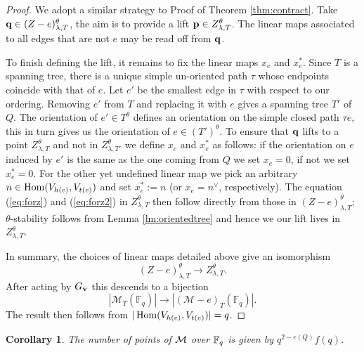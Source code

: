 \documentclass{amsart}
\newtheorem{cor}[thm]{Corollary}
\theoremstyle{definition}
\begin{document}
\begin{proof}
We adopt a similar strategy to Proof of Theorem \ref{thm:contract}.
Take $\mathbf{q} \in (Z-e)_{\lambda,T}^\theta$, the aim is to provide a lift $\mathbf{p} \in Z_{\lambda,T}^\theta$.
The linear maps associated to all edges that are not $e$ may be read off from $\mathbf{q}$.

To finish defining the lift, it remains to fix the linear maps $x_e$ and $x_e^*$.
Since $T$ is a spanning tree, there is a unique simple un-oriented path $\tau$ whose endpoints coincide with that of $e$.
Let $e'$ be the smallest edge in $\tau$ with respect to our ordering.
Removing $e'$ from $T$ and replacing it with $e$ gives a spanning tree $T'$ of $Q$.
The orientation of $e' \in T^\theta$ defines an orientation on the simple closed path $\tau e$, this in turn gives us the orientation of $e \in (T')^\theta$.
To ensure that $\mathbf{q}$ lifts to a point $Z_{\lambda,T}^\theta$ and not in $Z_{\lambda,T'}^\theta$ we define $x_e$ and $x_e^*$ as follows: if the orientation on $e$ induced by $e'$ is the same as the one coming from $Q$ we set $x_e=0$, if not we set $x_e^*=0$.
For the other yet undefined linear map we pick an arbitrary $n \in \operatorname{Hom}(V_{h(e)}, V_{t(e)})$ and set $x_e^*:=n$ (or $x_e=n^\vee$, respectively).
The equation (\ref{eq:forz}) and (\ref{eq:forz2}) in $Z_{\lambda,T}^\theta$ then follow directly from those in $(Z-e)_{\lambda,T}^\theta$; $\theta$-stability follows from Lemma \ref{lm:orientedtree} and hence we our lift lives in $Z_{\lambda,T}^\theta$.

In summary, the choices of linear maps detailed above give an isomorphism $$(Z-e)_{\lambda,T}^\theta \longrightarrow Z_{\lambda,T}^\theta.$$
After acting by $G_{\mathbf{v}}$ this descends to a bijection $$|\mathcal{M}_T(\mathbb{F}_q)| \longrightarrow |(\mathcal{M}-e)_T(\mathbb{F}_q)|.$$
The result then follows from $|\operatorname{Hom}(V_{h(e)}, V_{t(e)})|= q$.
\end{proof}

\begin{cor}
The number of points of $\mathcal{M}$ over $\mathbb{F}_q$ is given by $q^{2-e(Q)} f(q)$.
\end{cor}
\end{document}
